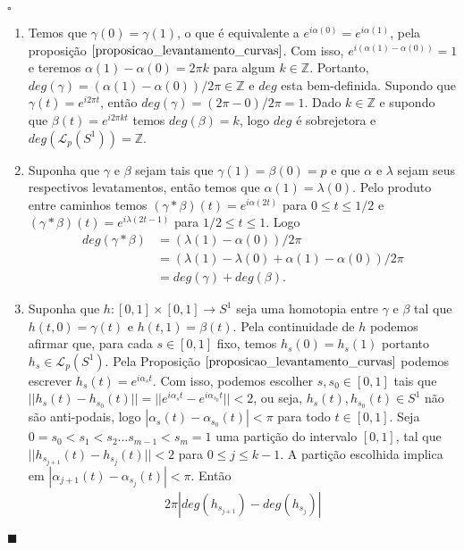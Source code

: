 \documentclass[12pt]{book}
\newenvironment{prova}[1]{$\square$ #1}{\hfill$\blacksquare$}
\newcommand{\caminhos}{\mathcal{L}}
\newcommand{\caminhospontobasegeral}[2]{\caminhos_{#1}(#2)}
\newcommand{\circulo}{S^{1}}
\newcommand{\inteiros}{\mathbb{Z}}
\newcommand{\norma}[1]{||#1||}
\begin{document}
	\begin{prova}
		\begin{enumerate}
			\item Temos que $\gamma(0) = \gamma(1)$, o que é equivalente a $e^{i\alpha(0)} = e^{i\alpha(1)}$, pela proposição $\ref{proposicao_levantamento_curvas}$. Com isso, $e^{i(\alpha(1)-\alpha(0))} = 1$ e teremos $\alpha(1)-\alpha(0) = 2\pi k$ para algum $k \in \inteiros$. Portanto, $deg(\gamma) = (\alpha(1)-\alpha(0))/2\pi \in \inteiros$ e $deg$ esta bem-definida. Supondo que $\gamma(t) = e^{i2\pi t}$, então $deg(\gamma) = (2\pi -0)/2\pi =1$. Dado $k \in \inteiros$ e supondo que $\beta(t) = e^{i2\pi kt}$ temos $deg(\beta) = k$, logo $deg$ é sobrejetora e $deg(\caminhospontobasegeral{p}{\circulo}) = \inteiros$.
			\item Suponha que $\gamma$ e $\beta$ sejam tais que $\gamma(1)= \beta(0) = p$ e que $\alpha$ e $\lambda$ sejam seus respectivos levatamentos, então temos que $\alpha(1) = \lambda(0)$. Pelo produto entre caminhos temos $(\gamma*\beta)(t) = e^{i\alpha(2t)}$ para $0\leq t\leq 1/2$ e  $(\gamma*\beta)(t) = e^{i\lambda(2t - 1)}$ para $1/2\leq t\leq 1$. Logo 
			$$
			\begin{aligned}
			deg(\gamma*\beta) &= (\lambda(1)- \alpha(0))/2\pi 
			\\
			&= (\lambda(1) -\lambda(0)+ \alpha(1)- \alpha(0))/2\pi
			\\
			&= deg(\gamma)+deg(\beta).
			\end{aligned}
			$$  
			\item Suponha que $h:[0,1]\times [0,1]\to S^{1}$ seja uma homotopia entre $\gamma$ e $\beta$ tal que $h(t,0) = \gamma(t)$ e $h(t,1) = \beta(t)$. Pela continuidade de $h$ podemos afirmar que, para cada $s \in [0,1]$ fixo, temos $h_{s}(0) = h_{s}(1)$ portanto $h_{s} \in \caminhospontobasegeral{p}{\circulo}$. Pela Proposição $\ref{proposicao_levantamento_curvas}$ podemos escrever $h_{s}(t) = e^{i\alpha_{s}t}$. Com isso, podemos escolher $s, s_{0 }\in [0,1]$ tais que $\norma{h_{s}(t)-h_{s_{0}}(t)} =\norma{e^{i\alpha_{s}t} - e^{i\alpha_{s_{0}}t}} <2$, ou seja, $h_{s}(t), h_{s_{0}}(t) \in \circulo$ não são anti-podais, logo $|\alpha_{s}(t)-\alpha_{s_{0}}(t)| <\pi$ para todo $t\in [0,1]$. Seja $0=s_{0}<s_{1}<s_{2}\dots s_{m-1}<s_{m} = 1$ uma partição do intervalo $[0,1]$, tal que $\norma{h_{s_{j+1}}(t)-h_{s_{j}}(t)}<2$ para $0\leq j \leq k-1$. A partição escolhida implica em $|\alpha_{j+1}(t)-\alpha_{s_{j}}(t)| <\pi$. Então
			$$
			\begin{aligned}
			2\pi|deg(h_{s_{j+1}})-deg(h_{s_{j}})| 

\end{aligned}$$
\end{enumerate}
\end{prova}
\end{document}
